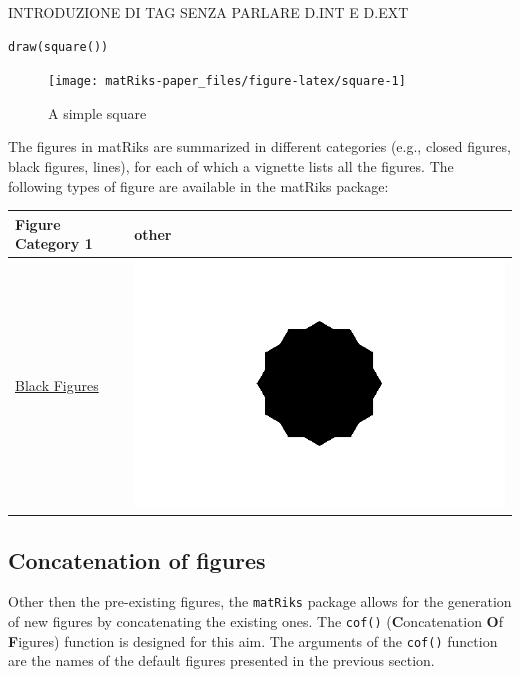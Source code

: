 INTRODUZIONE DI TAG SENZA PARLARE D.INT E D.EXT

\begin{verbatim}
draw(square())
\end{verbatim}

\begin{figure}

{\centering \texttt{[image: matRiks-paper\_files/figure-latex/square-1]} 

}

\caption{A simple square}\label{fig:square}
\end{figure}

The figures in matRiks are summarized in different categories (e.g., closed figures, black figures, lines), for each of which a vignette lists all the figures.
The following types of figure are available in the matRiks package:

\begin{tabular}[t]{l|>{}l}
\hline
Figure Category 1 & other\\
\hline
\href{https://cran.r-project.org/web/packages/matRiks/vignettes/black-figures.html}{Black Figures} & \includegraphics{black-figures.png}\\
\hline
\end{tabular}

\subsection{Concatenation of figures}\label{concatenation-of-figures}

Other then the pre-existing figures, the \texttt{matRiks} package allows for the generation of new figures by concatenating the existing ones.
The \texttt{cof()} (\textbf{C}oncatenation \textbf{O}f \textbf{F}igures) function is designed for this aim.
The arguments of the \texttt{cof()} function are the names of the default figures presented in the previous section.

